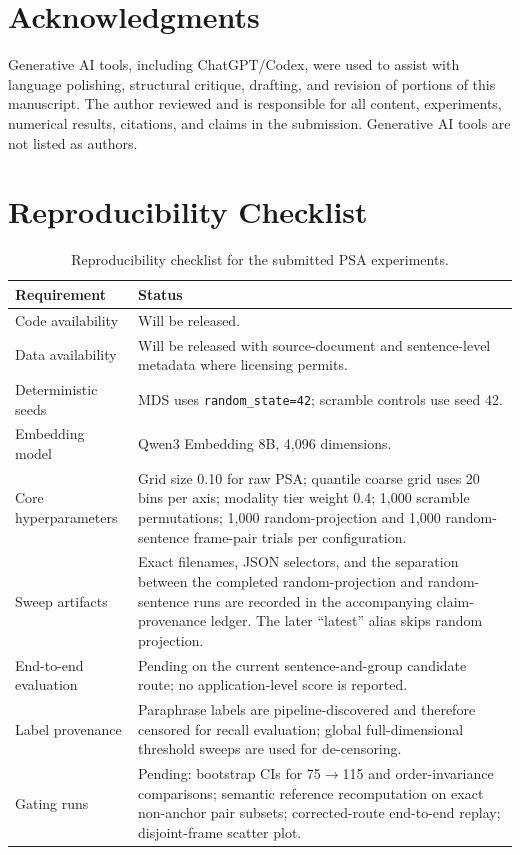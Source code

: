 \documentclass[11pt]{article}
\begin{document}
\section*{Acknowledgments}

Generative AI tools, including ChatGPT/Codex, were used to assist with language polishing, structural critique, drafting, and revision of portions of this manuscript. The author reviewed and is responsible for all content, experiments, numerical results, citations, and claims in the submission. Generative AI tools are not listed as authors.



\clearpage
\onecolumn
\appendix

\section{Reproducibility Checklist}

\begin{table}[!ht]
\centering
\small
\begin{tabularx}{\textwidth}{@{}lY@{}}
\toprule
Requirement & Status \\
\midrule
Code availability & Will be released. \\
Data availability & Will be released with source-document and sentence-level metadata where licensing permits. \\
Deterministic seeds & MDS uses \texttt{random\_state=42}; scramble controls use seed 42. \\
Embedding model & Qwen3 Embedding 8B, 4,096 dimensions. \\
Core hyperparameters & Grid size 0.10 for raw PSA; quantile coarse grid uses 20 bins per axis; modality tier weight 0.4; 1,000 scramble permutations; 1,000 random-projection and 1,000 random-sentence frame-pair trials per configuration. \\
Sweep artifacts & Exact filenames, JSON selectors, and the separation between the completed random-projection and random-sentence runs are recorded in the accompanying claim-provenance ledger. The later ``latest'' alias skips random projection. \\
End-to-end evaluation & Pending on the current sentence-and-group candidate route; no application-level score is reported. \\
Label provenance & Paraphrase labels are pipeline-discovered and therefore censored for recall evaluation; global full-dimensional threshold sweeps are used for de-censoring. \\
Gating runs & Pending: bootstrap CIs for 75$\rightarrow$115 and order-invariance comparisons; semantic reference recomputation on exact non-anchor pair subsets; corrected-route end-to-end replay; disjoint-frame scatter plot. \\
\bottomrule
\end{tabularx}
\caption{Reproducibility checklist for the submitted PSA experiments.}
\label{tab:checklist}
\end{table}
\end{document}
